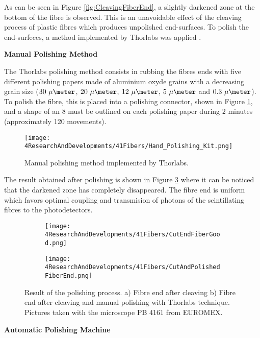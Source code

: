 As can be seen in Figure \ref{fig:CleavingFiberEnd}, a slightly darkened zone at the bottom of the fibre is observed. This is an unavoidable effect of the cleaving process of plastic fibres which produces unpolished end-surfaces. To polish the end-surfeces, a method implemented by Thorlabs was applied \cite{DiamondThorlabs}. 

\textbf{Manual Polishing Method}

The Thorlabs polishing method consists in rubbing the fibres ends with five different polishing papers made of aluminium oxyde grains with a decreasing grain size ($30~\mu\meter$, $20~\mu\meter$, $12~\mu\meter$, $5~\mu\meter$ and $0.3~\mu\meter$). To polish the fibre, this is placed into a polishing connector, shown in Figure \ref{fig:HandPolishingMethod}, and a shape of an 8 must be outlined on each polishing paper during 2 minutes (approximately 120 movements). 

\begin{figure}[h]
\centering
\texttt{[image: 4ResearchAndDevelopments/41Fibers/Hand\_Polishing\_Kit.png]}
\caption{Manual polishing method implemented by Thorlabs.\label{fig:HandPolishingMethod}}
\end{figure}
The result obtained after polishing is shown in Figure \ref{subfig:PolishFiberEnd} where it can be noticed that the darkened zone has completely disappeared. The fibre end is uniform which favors optimal coupling and transmision of photons of the scintillating fibres to the photodetectors.

\begin{figure}
\centering
    \begin{subfigure}[b]{0.5\textwidth}
    \centering
    \texttt{[image: 4ResearchAndDevelopments/41Fibers/CutEndFiberGood.png]}  
    \caption{\label{subfig:CleaveFiberEnd}}
    \end{subfigure}
    \hfill
    \begin{subfigure}[b]{0.45\textwidth}
    \centering
    \texttt{[image: 4ResearchAndDevelopments/41Fibers/CutAndPolishedFiberEnd.png]}  
    \caption{\label{subfig:PolishFiberEnd}}
    \end{subfigure}
 \caption{Result of the polishing process. a) Fibre end after cleaving b) Fibre end after cleaving and manual polishing with Thorlabs technique. Pictures taken with the microscope PB 4161 from EUROMEX.}
 \label{fig:ResultofPolishingProcess}
\end{figure}

\newpage
\textbf{Automatic Polishing Machine}

